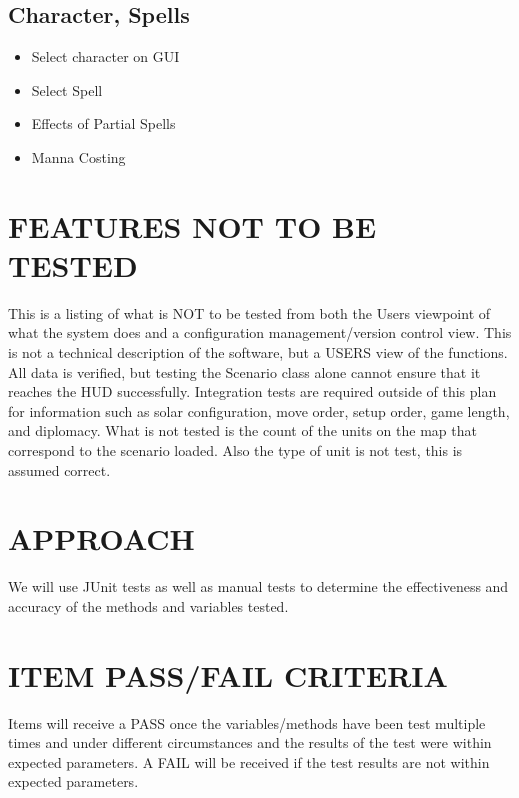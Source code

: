 {{\subsection{Character, Spells}
\begin{itemize}
\item Select character on GUI
\item Select Spell
\item Effects of Partial Spells
\item Manna Costing
\end{itemize}
}

\section[FEATURES NOT TO BE TESTED]{\bfseries\color{black} FEATURES NOT TO BE TESTED}

{\color{black}
This is a listing of what is NOT to be tested from both the Users
viewpoint of what the system does and a configuration
management/version control view. This is not a technical description
of the software, but a USERS view of the functions.
\newline
\newline
All data is verified, but testing the Scenario class alone cannot ensure 
that it reaches the HUD successfully. Integration tests are required outside 
of this plan for information such as solar configuration, move order, setup order, 
game length, and diplomacy.
\newline
\newline
What is not tested is the count of the units on the map that correspond to the scenario loaded. Also the type of unit is not test, this is assumed correct. 
}

\section[APPROACH]{\bfseries\color{black} APPROACH}
{\color{black}

{\color{black}

We will use JUnit tests as well as manual tests to determine the effectiveness and accuracy of the methods and variables tested. 

}

\section[ITEM PASS/FAIL CRITERIA]{\bfseries\color{black}
	 ITEM PASS/FAIL CRITERIA}
{\color{black}
Items will receive a PASS once the variables/methods have been test multiple times and under different circumstances and the results of the test were within expected parameters. A FAIL will be received if the test results are not within expected parameters. 
}

}}
